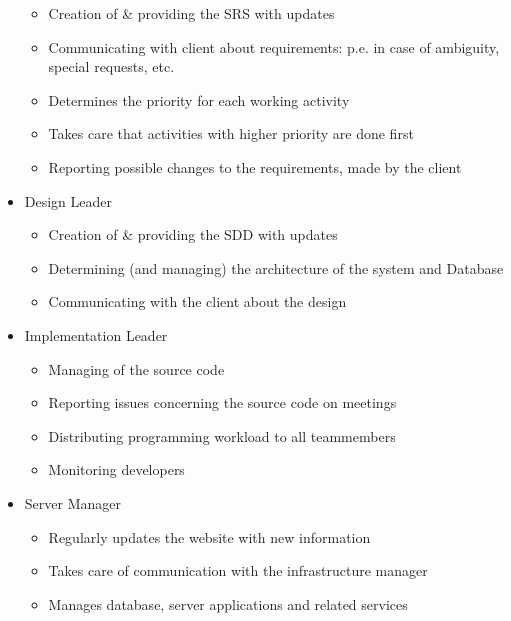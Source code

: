\documentclass[9pt]{article}
\begin{document}
\begin{itemize}
  \begin{itemize}
  \itemsep1pt\parskip0pt
  \item
    Creation of \& providing the SRS with updates
  \item
    Communicating with client about requirements: p.e. in case of
    ambiguity, special requests, etc.
  \item
    Determines the priority for each working activity
  \item
    Takes care that activities with higher priority are done first
  \item
    Reporting possible changes to the requirements, made by the client
  \end{itemize}
\item
  Design Leader

  \begin{itemize}
  \itemsep1pt\parskip0pt
  \item
    Creation of \& providing the SDD with updates
  \item
    Determining (and managing) the architecture of the system and
    Database
  \item
    Communicating with the client about the design
  \end{itemize}
\item
  Implementation Leader

  \begin{itemize}
  \itemsep1pt\parskip0pt
  \item
    Managing of the source code
  \item
    Reporting issues concerning the source code on meetings
  \item
    Distributing programming workload to all teammembers
  \item
    Monitoring developers
  \end{itemize}
\item
  Server Manager

  \begin{itemize}
  \itemsep1pt\parskip0pt
  \item
    Regularly updates the website with new information
  \item
    Takes care of communication with the infrastructure manager
  \item
    Manages database, server applications and related services
  \end{itemize}
\end{itemize}
\end{document}
